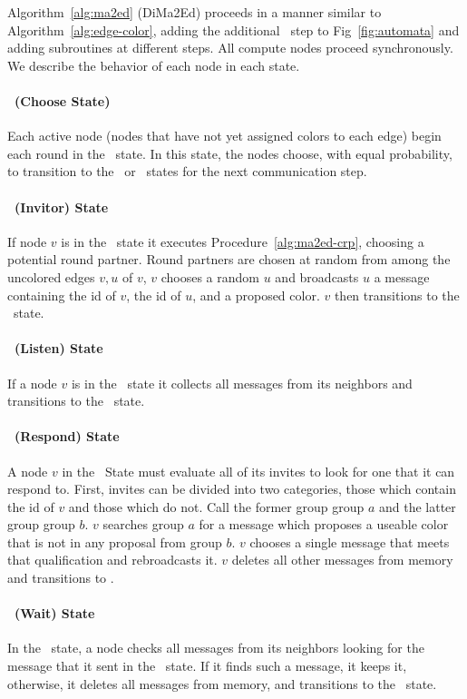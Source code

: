\label{sec:dima2ed-description}

Algorithm~\ref{alg:ma2ed} (DiMa2Ed) proceeds in a manner similar to Algorithm~\ref{alg:edge-color}, adding the additional \cEd\ step to Fig~\ref{fig:automata} and adding subroutines at different steps. All compute nodes proceed synchronously. We describe the behavior of each node in each state.

\paragraph{\cCd\ (Choose State)}
Each active node (nodes that have not yet assigned colors to each edge) begin each round in the \cCd\ state. In this state, the nodes choose, with equal probability, to transition to the \cId\ or \cLd\ states for the next communication step.

\paragraph{\cId\ (Invitor) State}
If node $v$ is in the \cId\ state it executes Procedure~\ref{alg:ma2ed-crp}, choosing a potential round partner. Round partners are chosen at random from among the uncolored edges $v,u$ of $v$, $v$ chooses a random $u$ and broadcasts $u$ a message containing the id of $v$, the id of $u$, and a proposed color. $v$ then transitions to the \cWd\ state.

\paragraph{\cLd\ (Listen) State}
If a node $v$ is in the \cLd\ state it collects all messages from its neighbors and transitions to the \cRd\ state. 

\paragraph{\cRd\ (Respond) State}
A node $v$ in the \cRd\ State must evaluate all of its invites to look for one that it can respond to. First, invites can be divided into two categories, those which contain the id of $v$ and those which do not. Call the former group group $a$ and the latter group group $b$. $v$ searches group $a$ for a message which proposes a useable color that is not in any proposal from group $b$. $v$ chooses a single message that meets that qualification and rebroadcasts it. $v$ deletes all other messages from memory and transitions to \cUd.

\paragraph{\cWd\ (Wait) State}
In the \cWd\ state, a node checks all messages from its neighbors looking for the message that it sent in the \cId\ state. If it finds such a message, it keeps it, otherwise, it deletes all messages from memory, and transitions to the \cUd\ state.

